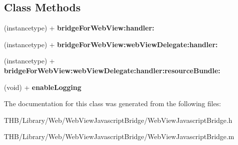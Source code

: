 \subsection*{Class Methods}
\begin{DoxyCompactItemize}
\item 
\mbox{\label{interface_web_view_javascript_bridge_a9ea99bcb1e8c45c58d8c48dc85f9e399}} 
(instancetype) + {\bfseries bridge\+For\+Web\+View\+:handler\+:}
\item 
\mbox{\label{interface_web_view_javascript_bridge_a10def3b8a43a3e3c64d49c85a699f166}} 
(instancetype) + {\bfseries bridge\+For\+Web\+View\+:web\+View\+Delegate\+:handler\+:}
\item 
\mbox{\label{interface_web_view_javascript_bridge_a4797e25b8bd18e180bb6cf021f1ad785}} 
(instancetype) + {\bfseries bridge\+For\+Web\+View\+:web\+View\+Delegate\+:handler\+:resource\+Bundle\+:}
\item 
\mbox{\label{interface_web_view_javascript_bridge_a93dd6fa69e2dc0ad91dd0c7637912b91}} 
(void) + {\bfseries enable\+Logging}
\end{DoxyCompactItemize}


The documentation for this class was generated from the following files\+:\begin{DoxyCompactItemize}
\item 
T\+H\+B/\+Library/\+Web/\+Web\+View\+Javascript\+Bridge/Web\+View\+Javascript\+Bridge.\+h\item 
T\+H\+B/\+Library/\+Web/\+Web\+View\+Javascript\+Bridge/Web\+View\+Javascript\+Bridge.\+m\end{DoxyCompactItemize}
